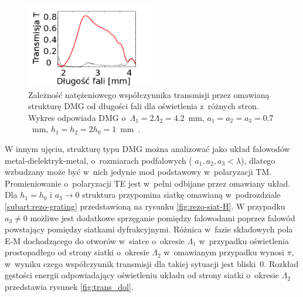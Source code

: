 \begin{figure}
	\centering
	\includegraphics[width=0.5\textwidth]{images/thz/opt_lett_spect.png}
	\caption{Zależność natężeniowego współczynnika transmisji przez omawianą strukturę DMG od długości fali dla oświetlenia z~różnych stron. Wykres odpowiada DMG o~$\Lambda_1= 2 \Lambda_2 = 4.2$~mm, $a_1=a_2=a_3=0.7$~mm, $h_1=h_2=2 h_0=1$~mm~\cite{Stolarek:13}.}
	\label{fig:trans_freq}
\end{figure}

 W innym ujęciu, strukturę typu DMG można analizować jako układ falowodów metal-dielektryk-metal, o~rozmiarach podfalowych ( $a_1,a_2,a_3 < \lambda$), dlatego wzbudzany może być w~nich jedynie mod podstawowy w~polaryzacji TM. Promieniowanie o~polaryzacji TE jest w~pełni odbijane przez omawiany układ. Dla $h_1=h_0$ i $a_3 \to 0$ struktura przypomina siatkę omawianą w~podrozdziale \ref{subart:rezo-grating} przedstawioną na rysunku \ref{fig:rezo-siat-H}. W przypadku $a_3 \ne 0$ możliwe jest dodatkowe sprzęganie pomiędzy falowodami poprzez falowód powstający pomiędzy siatkami dyfrakcyjnymi. Różnica w~fazie składowych pola E-M dochodzącego do otworów w~siatce o~okresie $\Lambda_1$ w~przypadku oświetlenia prostopadłego od strony siatki o~okresie $\Lambda_2$ w~omawianym przypadku wynosi $\pi$, w~wyniku czego współczynnik transmisji dla takiej sytuacji jest bliski~0. Rozkład gęstości energii odpowiadający oświetleniu układu od strony siatki o~okresie $\Lambda_2$ przedstawia rysunek \ref{fig:trans_dol}.


